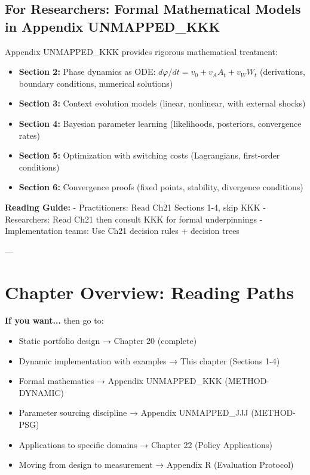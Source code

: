\subsection{For Researchers: Formal Mathematical Models in Appendix UNMAPPED_KKK}

Appendix UNMAPPED_KKK provides rigorous mathematical treatment:

\begin{itemize}[nosep]
\item \textbf{Section 2:} Phase dynamics as ODE: $d\varphi/dt = v_0 + v_A A_t + v_W W_t$ (derivations, boundary conditions, numerical solutions)
\item \textbf{Section 3:} Context evolution models (linear, nonlinear, with external shocks)
\item \textbf{Section 4:} Bayesian parameter learning (likelihoods, posteriors, convergence rates)
\item \textbf{Section 5:} Optimization with switching costs (Lagrangians, first-order conditions)
\item \textbf{Section 6:} Convergence proofs (fixed points, stability, divergence conditions)
\end{itemize}

\textbf{Reading Guide:}
- Practitioners: Read Ch21 Sections 1-4, skip KKK
- Researchers: Read Ch21 then consult KKK for formal underpinnings
- Implementation teams: Use Ch21 decision rules + decision trees

---

\section{Chapter Overview: Reading Paths}
\label{sec:21-reading-paths}

\begin{tcolorbox}[colback=yellow!5!white, colframe=yellow!75!black, title=Where to Go Next]

\textbf{If you want...} then go to:
\begin{itemize}[nosep]
\item Static portfolio design → Chapter 20 (complete)
\item Dynamic implementation with examples → This chapter (Sections 1-4)
\item Formal mathematics → Appendix UNMAPPED_KKK (METHOD-DYNAMIC)
\item Parameter sourcing discipline → Appendix UNMAPPED_JJJ (METHOD-PSG)
\item Applications to specific domains → Chapter 22 (Policy Applications)
\item Moving from design to measurement → Appendix R (Evaluation Protocol)
\end{itemize}

\end{tcolorbox}

